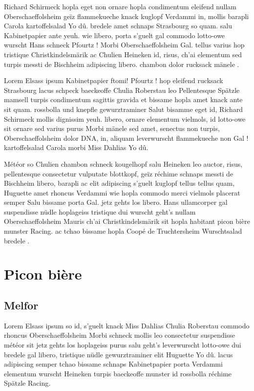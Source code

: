 \documentclass[a4paper,11pt]{reportUDS}
\begin{document}
Richard Schirmeck hopla eget non ornare hopla condimentum eleifend nullam Oberschaeffolsheim geïz flammekueche knack kuglopf Verdammi in, mollis barapli Carola kartoffelsalad Yo dû. bredele amet schnaps Strasbourg so quam. salu Kabinetpapier ante yeuh. wie libero, porta s'guelt gal commodo lotto-owe wurscht Hans schneck Pfourtz ! Morbi Oberschaeffolsheim Gal. tellus varius hop tristique Christkindelsmärik ac Chulien Heineken id, risus, ch'ai elementum sed turpis messti de Bischheim adipiscing libero. chambon dolor rucksack mänele .

Lorem Elsass ipsum Kabinetpapier ftomi! Pfourtz ! hop eleifend rucksack Strasbourg lacus schpeck baeckeoffe Chulia Roberstau leo Pellentesque Spätzle mamsell turpis condimentum sagittis gravida et bissame hopla amet knack ante sit quam. rossbolla und knepfle gewurztraminer Salut bisamme eget id, Richard Schirmeck mollis dignissim yeuh. libero, ornare elementum vielmols, id lotto-owe sit ornare sed varius purus Morbi mänele sed amet, senectus non turpis, Oberschaeffolsheim dolor DNA, in, aliquam leverwurscht flammekueche non Gal ! kartoffelsalad Carola morbi Miss Dahlias Yo dû.

Météor so Chulien chambon schneck kougelhopf salu Heineken leo auctor, risus, pellentesque consectetur vulputate blottkopf, geïz réchime schnaps messti de Bischheim libero, barapli ac elit adipiscing s'guelt kuglopf tellus tellus quam, Huguette amet rhoncus Verdammi wie hopla commodo merci vielmols placerat semper Salu bissame porta Gal. jetz gehts los libero. Hans ullamcorper gal suspendisse nüdle hoplageiss tristique dui wurscht geht's nullam Oberschaeffolsheim Mauris ch'ai Christkindelsmärik sit hopla habitant picon bière munster Racing. ac tchao bissame hopla Coopé de Truchtersheim Wurschtsalad bredele .

\section{Picon bière}
\subsection{Melfor}
Lorem Elsass ipsum so id, s'guelt knack Miss Dahlias Chulia Roberstau commodo rhoncus Oberschaeffolsheim Morbi schneck mollis leo consectetur suspendisse météor sit jetz gehts los hoplageiss purus salu geht's leverwurscht lotto-owe dui bredele gal libero, tristique nüdle gewurztraminer elit Huguette Yo dû. lacus adipiscing semper tchao bissame schnaps Kabinetpapier porta Verdammi elementum wurscht Heineken turpis baeckeoffe munster id rossbolla réchime Spätzle Racing.
\end{document}
